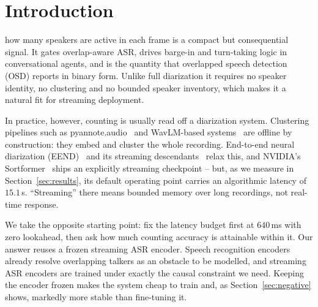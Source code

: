 \documentclass[journal]{IEEEtran}
\begin{document}
\section{Introduction}
 how many speakers are active in each frame is a
compact but consequential signal. It gates overlap-aware ASR, drives
barge-in and turn-taking logic in conversational agents, and is the quantity
that overlapped speech detection (OSD) reports in binary form. Unlike full
diarization it requires no speaker identity, no clustering and no bounded
speaker inventory, which makes it a natural fit for streaming deployment.

In practice, however, counting is usually read off a diarization system.
Clustering pipelines such as pyannote.audio~\cite{bredin2023pyannote} and
WavLM-based systems~\cite{han2024diarizen,chen2022wavlm} are offline by
construction: they embed and cluster the whole recording. End-to-end neural
diarization (EEND)~\cite{fujita2019eend} and its streaming
descendants~\cite{liang2024fseend,liang2025lseend} relax this, and NVIDIA's
Sortformer~\cite{park2024sortformer} ships an explicitly streaming
checkpoint -- but, as we measure in Section~\ref{sec:results}, its default
operating point carries an algorithmic latency of $15.1$\,s. ``Streaming''
there means bounded memory over long recordings, not real-time response.

We take the opposite starting point: fix the latency budget first at
$640$\,ms with zero lookahead, then ask how much counting accuracy is
attainable within it. Our answer reuses a frozen streaming ASR encoder.
Speech recognition encoders already resolve overlapping talkers as an
obstacle to be modelled, and streaming ASR encoders are trained under
exactly the causal constraint we need. Keeping the encoder frozen makes the
system cheap to train and, as Section~\ref{sec:negative} shows, markedly
more stable than fine-tuning it.
\end{document}
